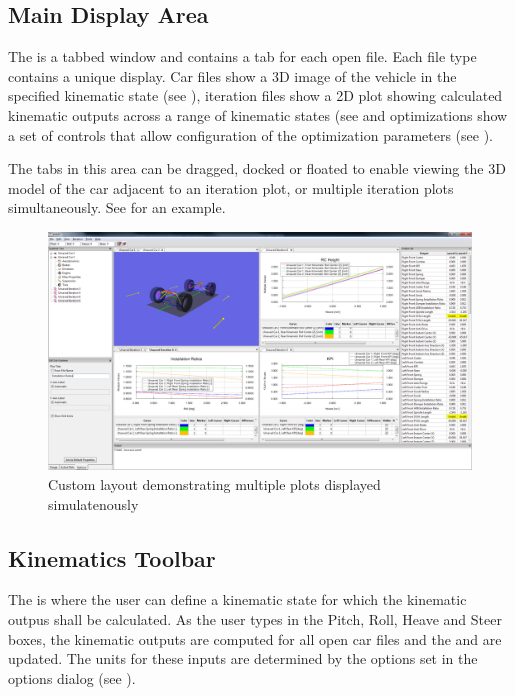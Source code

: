 \subsection{Main Display Area} \label{ssec:mainDisplayArea}

The  is a tabbed window and contains a tab for each open file.  Each file type contains a unique display.  Car files show a 3D image of the vehicle in the specified kinematic state (see ), iteration files show a 2D plot showing calculated kinematic outputs across a range of kinematic states (see  and optimizations show a set of controls that allow configuration of the optimization parameters (see ).

The tabs in this area can be dragged, docked or floated to enable viewing the 3D model of the car adjacent to an iteration plot, or multiple iteration plots simultaneously.  See  for an example.

\begin{figure}
  \includegraphics[width=\textwidth]{images/multiPlot}
  \caption{Custom layout demonstrating multiple plots displayed simulatenously} \label{fig:multiPlot}
  \centering
\end{figure}

\subsection{Kinematics Toolbar} \label{ssec:kinematicsToolbar}

The  is where the user can define a kinematic state for which the kinematic outpus shall be calculated.  As the user types in the Pitch, Roll, Heave and Steer boxes, the kinematic outputs are computed for all open car files and the  and  are updated.  The units for these inputs are determined by the options set in the options dialog (see ).

